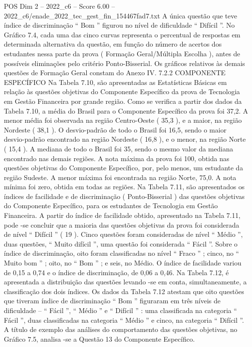 \begin{textsample}{POS Dim 2 – 2022\_c6 – Score 6.00 – 2022\_c6/enade\_2022\_tec\_gest\_fin\_154467fad7.txt}
A única questão que teve índice de discriminação “ Bom ” figurou no nível de dificuldade “ Difícil ”.
No Gráfico 7.4, cada uma das cinco curvas representa o percentual de respostas em determinada alternativa da questão, em função do número de acertos dos estudantes nessa parte da prova ( Formação Geral/Múltipla Escolha ), antes de possíveis eliminações pelo critério Ponto-Bisserial.
Os gráficos relativos às demais questões de Formação Geral constam do Anexo IV. 7.2.2 COMPONENTE ESPECÍFICO Na Tabela 7.10, são apresentadas as Estatísticas Básicas em relação às questões objetivas do Componente Específico da prova de Tecnologia em Gestão Financeira por grande região.
Como se verifica a partir dos dados da Tabela 7.10, a média do Brasil para o Componente Específico da prova foi 37,2.
A menor média foi observada na região Centro-Oeste ( 35,3 ), e a maior, na região Nordeste ( 38,1 ).
O desvio-padrão de todo o Brasil foi 16,5, sendo o maior desvio-padrão encontrado na região Nordeste ( 16,8 ), e o menor, na região Norte ( 15,4 ).
A mediana de todo o Brasil foi 35, sendo o mesmo valor da mediana encontrado nas demais regiões.
A nota máxima da prova foi 100, obtida nas questões objetivas do Componente Específico, por, pelo menos, um estudante da região Sudeste.
A menor máxima foi encontrada na região Norte, 75,0.
A nota mínima foi zero, obtida em todas as regiões.
Na Tabela 7.11, são apresentados os índices de facilidade e de discriminação ( Ponto-Bisserial ) das questões objetivas do Componente Específico, para os estudantes de Tecnologia em Gestão Financeira.
A partir do índice de facilidade obtido, apresentado na Tabela 7.11, pode -se concluir que a maioria das questões objetivas da prova foi considerada de nível “ Difícil ” ( 19 ).
Cinco questões foram consideradas de nível “ Médio ”, duas questões, “ Muito difícil ”, uma questão foi considerada “ Fácil ”.
Sobre o índice de discriminação, oito foram classificadas no nível “ Fraco ” ; cinco, no “ Muito bom ” ; oito, no “ Bom ” ; e seis, no Médio.
O índice de facilidade variou de 0,15 a 0,74 e o índice de discriminação, de 0,06 a 0,46.
Na Tabela 7.12, é apresentada a distribuição das questões levando -se em conta, simultaneamente, a classificação dos dois índices.
Os dados da Tabela 7.12 atestam que oito questões que tiveram índice de discriminação “ Bom ” figuraram em três níveis de dificuldade – “ Fácil ”, “ Médio ” e “ Difícil ” : uma classificada na categoria “ Fácil ”, duas classificadas na categoria “ Médio ” e cinco, na categoria “ Difícil ”.
A título de exemplo das análises do comportamento das questões objetivas, no Gráfico 7.5, analisa -se a Questão 13 do Componente Específico.

\end{textsample}
